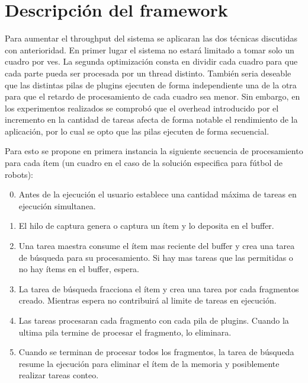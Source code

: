 
\section{Descripción del framework}

Para aumentar el throughput del sistema se aplicaran las dos técnicas discutidas
con anterioridad. En primer lugar el sistema no estará limitado a tomar solo un
cuadro por ves. La segunda optimización consta en dividir cada cuadro para que
cada parte pueda ser procesada por un thread distinto. También seria deseable
que las distintas pilas de plugins ejecuten de forma independiente una de la
otra para que el retardo de procesamiento de cada cuadro sea menor.  Sin
embargo, en los experimentos realizados se comprobó que el overhead introducido
por el incremento en la cantidad de tareas afecta de forma notable el
rendimiento de la aplicación, por lo cual se opto que las pilas ejecuten de
forma secuencial.

Para esto se propone en primera instancia la siguiente secuencia de
procesamiento para cada ítem (un cuadro en el caso de la solución especifica
para fútbol de robots):

\begin{enumerate}

\setcounter{enumi}{-1}

\item	Antes de la ejecución el usuario establece una cantidad máxima de tareas
	en ejecución simultanea.

\item	El hilo de captura genera o captura un ítem y lo deposita en el buffer.

\item	Una tarea maestra consume el ítem mas reciente del buffer y crea una
	tarea de búsqueda para su procesamiento. Si hay mas tareas que las
	permitidas o no hay ítems en el buffer, espera.

\item	La tarea de búsqueda fracciona el ítem y crea una tarea por cada
	fragmentos creado. Mientras espera no contribuirá al limite de tareas en
	ejecución.

\item	Las tareas procesaran cada fragmento con cada pila de plugins.  Cuando
	la ultima pila termine de procesar el fragmento, lo eliminara.

\item	Cuando se terminan de procesar todos los fragmentos, la tarea de
	búsqueda resume la ejecución para eliminar el ítem de la memoria y
	posiblemente realizar tareas conteo.

\end{enumerate}

